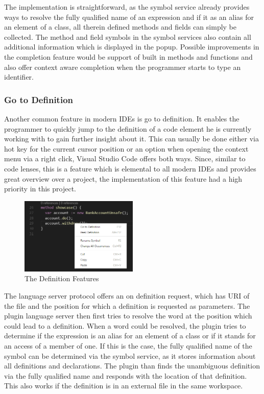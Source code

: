 The implementation is straightforward, as the symbol service already provides ways to resolve the fully qualified name of an expression and if it as an alias for an element of a class, all therein defined methods and fields can simply be collected. The method and field symbols in the symbol services also contain all additional information which is displayed in the popup. Possible improvements in the completion feature would be support of built in methods and functions and also offer context aware completion when the programmer starts to type an identifier. 

\subsubsection{Go to Definition} \label{gotodefinition}
Another common feature in modern IDEs is go to definition. It enables the programmer to quickly jump to the definition of a code element he is currently working with to gain further insight about it. This can usually be done either via hot key for the current cursor position or an option when opening the context menu via a right click, Visual Studio Code offers both ways.\newline
Since, similar to code lenses, this is a feature which is elemental to all modern IDEs and provides great overview over a project, the implementation of this feature had a high priority in this project. \newline
 \begin{figure}[H]
	\centering
	\includegraphics[width=0.5\textwidth]{img/goToDefinition}
	\caption{The Definition Features}
	\label{fig:gotodefinition}
\end{figure}
The language server protocol offers an on definition request, which has URI of the file and the position for which a definition is requested as parameters. The plugin language server then first tries to resolve the word at the position which could lead to a definition. When a word could be resolved, the plugin tries to determine if the expression is an alias for an element of a class or if it stands for an access of a member of one. If this is the case, the fully qualified name of the symbol can be determined via the symbol service, as it stores information about all definitions and declarations. The plugin than finds the unambiguous definition via the fully qualified name and responds with the location of that definition. This also works if the definition is in an external file in the same workspace. \newline
